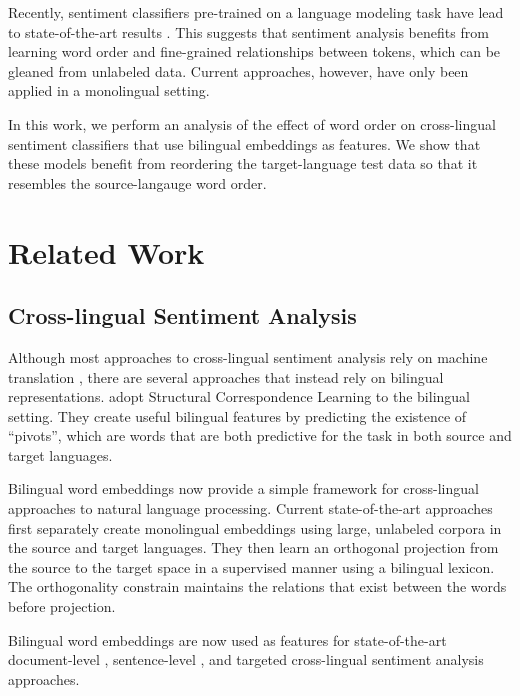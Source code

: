 \documentclass[11pt,a4paper]{article}
\begin{document}
Recently, sentiment classifiers pre-trained on a language modeling task have lead to state-of-the-art results \cite{Peters2018,Howard2018,Devlin2018}. This suggests that sentiment analysis benefits from learning word order and fine-grained relationships between tokens, which can be gleaned from unlabeled data. Current approaches, however, have only been applied in a monolingual setting. 

In this work, we perform an analysis of the effect of word order on cross-lingual sentiment classifiers that use bilingual embeddings as features. We show that these models benefit from reordering the target-language test data so that it resembles the source-langauge word order.


\section{Related Work}

\subsection{Cross-lingual Sentiment Analysis}

Although most approaches to cross-lingual sentiment analysis rely on machine translation \cite{Banea2008,Balahur2014d,Klinger2015},
there are several approaches that instead rely on bilingual representations. 
 adopt Structural Correspondence Learning to the
bilingual setting. They create useful bilingual features by predicting the existence
of ``pivots'', which are words that are both predictive for the task in both source and target languages.

Bilingual word embeddings \cite{Kocisky2014,Chandar2014,Luong2015} now provide
a simple framework for cross-lingual approaches to natural language processing. 
Current state-of-the-art approaches \cite{Artetxe2017,Artetxe2018,Lample2017} first separately create monolingual embeddings using large, unlabeled corpora in the source and target languages. They then learn an orthogonal projection from the source to the target space in a supervised manner using a bilingual lexicon. The orthogonality constrain maintains the relations that exist between the words before projection.

Bilingual word embeddings are now used as features for state-of-the-art document-level \cite{Chen2016}, sentence-level \cite{Barnes2018b}, and targeted \cite{Hangya2018} cross-lingual sentiment analysis approaches.
\end{document}

